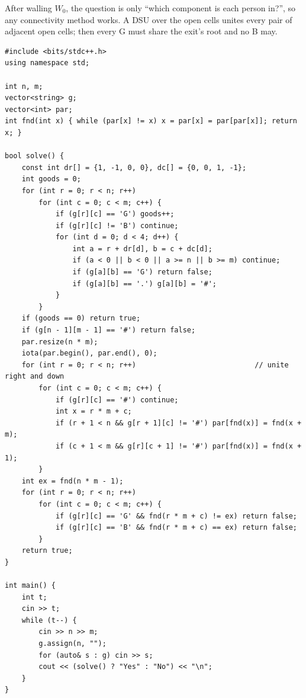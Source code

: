 \begin{alternativebox}
After walling $W_0$, the question is only ``which component is each person in?'', so any connectivity method works. A DSU over the open cells unites every pair of adjacent open cells; then every G must share the exit's root and no B may.

\begin{lstlisting}[style=cpp]
#include <bits/stdc++.h>
using namespace std;

int n, m;
vector<string> g;
vector<int> par;
int fnd(int x) { while (par[x] != x) x = par[x] = par[par[x]]; return x; }

bool solve() {
    const int dr[] = {1, -1, 0, 0}, dc[] = {0, 0, 1, -1};
    int goods = 0;
    for (int r = 0; r < n; r++)
        for (int c = 0; c < m; c++) {
            if (g[r][c] == 'G') goods++;
            if (g[r][c] != 'B') continue;
            for (int d = 0; d < 4; d++) {
                int a = r + dr[d], b = c + dc[d];
                if (a < 0 || b < 0 || a >= n || b >= m) continue;
                if (g[a][b] == 'G') return false;
                if (g[a][b] == '.') g[a][b] = '#';
            }
        }
    if (goods == 0) return true;
    if (g[n - 1][m - 1] == '#') return false;
    par.resize(n * m);
    iota(par.begin(), par.end(), 0);
    for (int r = 0; r < n; r++)                            // unite right and down
        for (int c = 0; c < m; c++) {
            if (g[r][c] == '#') continue;
            int x = r * m + c;
            if (r + 1 < n && g[r + 1][c] != '#') par[fnd(x)] = fnd(x + m);
            if (c + 1 < m && g[r][c + 1] != '#') par[fnd(x)] = fnd(x + 1);
        }
    int ex = fnd(n * m - 1);
    for (int r = 0; r < n; r++)
        for (int c = 0; c < m; c++) {
            if (g[r][c] == 'G' && fnd(r * m + c) != ex) return false;
            if (g[r][c] == 'B' && fnd(r * m + c) == ex) return false;
        }
    return true;
}

int main() {
    int t;
    cin >> t;
    while (t--) {
        cin >> n >> m;
        g.assign(n, "");
        for (auto& s : g) cin >> s;
        cout << (solve() ? "Yes" : "No") << "\n";
    }
}
\end{lstlisting}

\begin{center}
\end{center}


\end{alternativebox}
